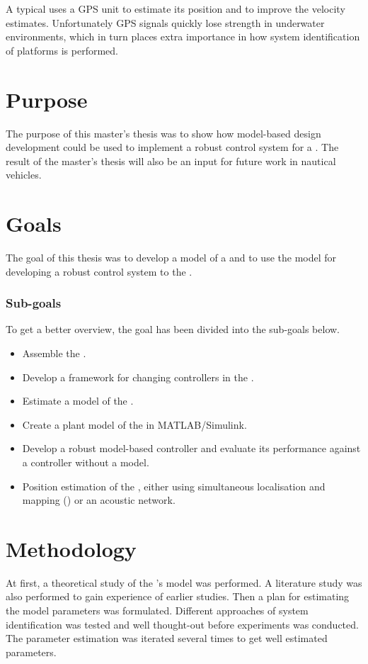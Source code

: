 A typical \abbrUV uses a GPS unit to estimate its position and to improve the velocity estimates. Unfortunately GPS signals quickly lose strength in underwater environments, which in turn places extra importance in how system identification of \abbrROV platforms is performed.


\section{Purpose}
The purpose of this master's thesis was to show how model-based design development could be used to implement a robust control system for a \abbrROV. The result of the master's thesis will also be an input for future work in nautical vehicles. 


\section{Goals}
The goal of this thesis was to develop a model of a \abbrROV and to use the model for developing a robust control system to the \abbrROV.

\subsubsection{Sub-goals}
To get a better overview, the goal has been divided into the sub-goals below.
\begin{itemize}
    \item Assemble the \abbrROV.
    \item Develop a framework for changing controllers in the \abbrROV.
    \item Estimate a model of the \abbrROV.
    \item Create a plant model of the \abbrROV in MATLAB/Simulink.
    \item Develop a robust model-based controller and evaluate its performance against a controller without a model.
    \item Position estimation of the \abbrROV, either using simultaneous localisation and mapping (\abbrSLAM) or an acoustic network.
\end{itemize}

\section{Methodology}
At first, a theoretical study of the \abbrROV's model was performed. A literature study was also performed to gain experience of earlier studies. Then a plan for estimating the model parameters was formulated. Different approaches of system identification was tested and well thought-out before experiments was conducted. The parameter estimation was iterated several times to get well estimated parameters. 

